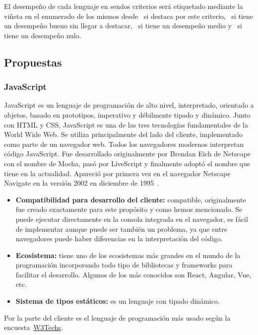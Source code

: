 El desempeño de cada lenguaje en sendos criterios será etiquetado mediante la viñeta en el enumerado de los mismos desde \esp~si destaca por este criterio, \bien~si tiene un desempeño bueno sin llegar a destacar, \regular~si tiene un desempeño medio y \mal~si tiene un desempeño nulo.

\subsection{Propuestas}

\subsubsection{JavaScript}

JavaScript es un lenguaje de programación de alto nivel, interpretado, orientado a objetos, basado en prototipos, imperativo y débilmente tipado y dinámico. Junto con HTML y CSS, JavaScript es una de las tres tecnologías fundamentales de la World Wide Web. Se utiliza principalmente del lado del cliente, implementado como parte de un navegador web. Todos los navegadores modernos interpretan código JavaScript. Fue desarrollado originalmente por Brendan Eich de Netscape con el nombre de Mocha, pasó por LiveScript y finalmente adoptó el nombre que tiene en la actualidad. Apareció por primera vez en el navegador Netscape Navigate en la versión 2002 en diciembre de 1995~\cite{javascript-wiki}.

\begin{itemize}
    \item[\esp] \textbf{Compatibilidad para desarrollo del cliente:} compatible, originalmente fue creado exactamente para este propósito y como hemos mencionado. Se puede ejecutar directamente en la consola integrada en el navegador, es fácil de implementar aunque puede ser también un problema, ya que entre navegadores puede haber diferencias en la interpretación del código.
    \item[\esp] \textbf{Ecosistema:} tiene uno de los ecosistemas más grandes en el mundo de la programación incorporando todo tipo de bibliotecas y frameworks para facilitar el desarrollo. Algunos de los más conocidos son React, Angular, Vue, etc.
    \item[\mal] \textbf{Sistema de tipos estáticos:} es un lenguaje con tipado dinámico.
\end{itemize}

Por la parte del cliente es el lenguaje de programación más usado según la encuesta~\href{https://w3techs.com/technologies/overview/client_side_language}{W3Techs}.

